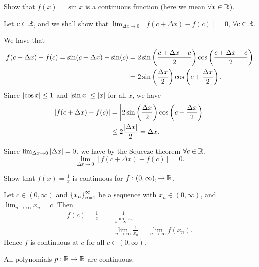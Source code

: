 \documentclass[12pt]{article}
\theoremstyle{definition}
\newcommand{\xn}{\set{x_{n}}_{n = 1}^{\infty}}
\newcommand{\nlim}{\lim_{n\rightarrow\infty}}
\begin{document}
        \begin{eg}
            Show that $f(x) = \sin x$ is a continuous function (here we mean $\forall x \in \R$).

            Let $c \in \R$, and we shall show that $\lim_{\Delta x \rightarrow 0}\left[f(c + \Delta x) - f(c)\right] = 0$, $\forall c \in \R$.

            We have that
            \begin{align*}
                f(c + \Delta x) - f(c) = \sin(c + \Delta x) - \sin(c) &= 2\sin\left(\frac{c + \Delta x - c}{2}\right)\cos\left(\frac{c + \Delta x + c}{2}\right) \\
                                                                      &= 2\sin\left(\frac{\Delta x}{2}\right)\cos\left(c + \frac{\Delta x}{2}\right).
            \end{align*}
            Since $\left|\cos x\right| \leq 1$ and $\left|\sin x\right| \leq \left|x\right|$ for all $x$, we have
            \begin{align*}
                \left|f(c + \Delta x) - f(c)\right| &= \left|2\sin\left(\frac{\Delta x}{2}\right)\cos\left(c + \frac{\Delta x}{2}\right)\right| \\
                                             &\leq 2 \frac{\left|\Delta x\right|}{2} = \Delta x.
            \end{align*}

            Since $\lim_{\Delta x \rightarrow 0}\left|\Delta x\right| = 0$, we have by the Squeeze theorem $\forall c \in \R$,
            \begin{equation*}
                \lim_{\Delta x \rightarrow 0}\left[f(c + \Delta x) - f(c)\right] = 0.
            \end{equation*}
        \end{eg}
        \begin{eg}
            Show that $f(x) = \frac{1}{x}$ is continuous for $f: (0, \infty), \rightarrow \R$.

            Let $c \in (0, \infty)$ and $\xn$ be a sequence with $x_{n} \in (0, \infty)$, and $\nlim x_{n} = c$. Then
            \begin{align*}
                f(c) = \frac{1}{c} &= \frac{1}{\nlim{x_{n}}} \\
                                   &= \nlim\frac{1}{x_{n}} = \nlim f(x_{n}).
            \end{align*} 
            Hence $f$ is continuous at $c$ for all $c \in (0, \infty)$.
        \end{eg}
        \begin{prop}
            All polynomials $p: \R \rightarrow \R$ are continuous.
        \end{prop}
\end{document}
